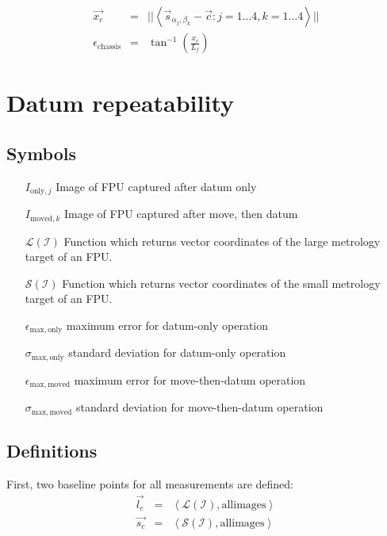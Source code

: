 \documentclass[11pt,a4paper]{scrartcl}
\begin{document}
\begin{eqnarray}
  \vec{x_c} & = & || \left< \vec{s}_{\alpha_j,\beta_k} - \vec{c} : j = 1 \ldots 4, k = 1 \ldots 4 \right> || \\
  \epsilon_\mathrm{chassis} & = & \tan^{-1}(\frac{x_c}{L_f})
\end{eqnarray}



\section{Datum repeatability}
\subsection{Symbols}
\begin{itemize}
\item[$I_{\mathrm{only},j}$] Image of FPU captured after datum only
\item[$I_{\mathrm{moved},k}$] Image of FPU captured after move, then datum
\item[$\mathcal{L(I)}$] Function which returns vector coordinates of
  the large metrology target of an FPU.
\item[$\mathcal{S(I)}$] Function which returns vector coordinates of
  the small metrology target of an FPU.

\item[$\epsilon_\mathrm{max,only}$] maximum error for datum-only operation
\item[$\sigma_\mathrm{max,only}$] standard deviation for datum-only operation
\item[$\epsilon_\mathrm{max,moved}$] maximum error for move-then-datum operation
\item[$\sigma_\mathrm{max,moved}$] standard deviation for move-then-datum operation


\end{itemize}
\subsection{Definitions}

First, two baseline points for all measurements are defined:
\begin{eqnarray}
  \vec{l_c} & =  & \left< \mathcal{L(I)}, \mathrm{ all images} \right> \\
  \vec{s_c} & =  & \left< \mathcal{S(I)}, \mathrm{ all images} \right> \\
\end{eqnarray}
\end{document}
